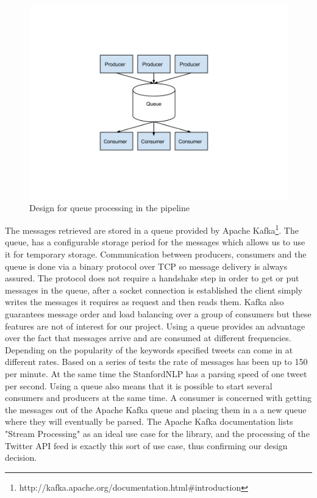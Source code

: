 \newline
\begin{figure}[ht!]
\centering
\includegraphics[width=\textwidth,height=\textheight,keepaspectratio]{src/img/queue.png}
\caption{Design for queue processing in the pipeline\label{overflow}}
\end{figure}
\newline
The messages retrieved are stored in a queue provided by Apache Kafka\footnote{http://kafka.apache.org/documentation.html\#introduction}. The queue, has a configurable storage period for the messages which allows us to use it for temporary storage.  Communication between producers, consumers and the queue is done via a binary protocol over TCP so message delivery is always assured. The protocol does not require a handshake step in order to get or put messages in the queue, after a socket connection is established the client simply writes the messages it requires as request and then reads them. Kafka also guarantees message order and load balancing over a group of consumers but these features are not of interest for our project. Using a queue provides an advantage over the fact that messages arrive and are consumed at different frequencies. Depending on the popularity of the keywords specified tweets can come in at different rates. Based on a series of tests the rate of messages has been up to 150 per minute. At the same time the StanfordNLP has a parsing speed of one tweet per second. Using a queue also means that it is possible to start several consumers and producers at the same time. A consumer is concerned with getting the messages out of the Apache Kafka queue and placing them in a a new queue where they will eventually be parsed. The Apache Kafka documentation lists "Stream Processing" as an ideal use case for the library, and the processing of the Twitter API feed is exactly this sort of use case, thus confirming our design decision.
